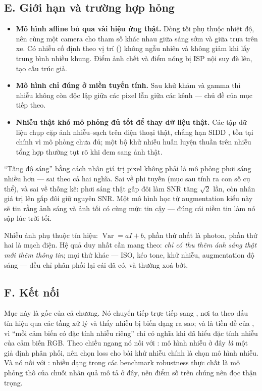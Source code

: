 \documentclass[../../../deep_learning.tex]{subfiles}
\begin{document}
\subsection{E. Giới hạn và trường hợp hỏng}
\begin{itemize}
\item \textbf{Mô hình affine bỏ qua vài hiệu ứng thật.} Dòng tối phụ thuộc nhiệt độ, nên cùng một camera cho tham số khác nhau giữa sáng sớm và giữa trưa trên xe. Có nhiễu cố định theo vị trí () không ngẫu nhiên và không giảm khi lấy trung bình nhiều khung. Điểm ảnh chết và điểm nóng bị ISP nội suy đè lên, tạo cấu trúc giả.
\item \textbf{Mô hình chỉ đúng ở miền tuyến tính.} Sau khử khảm và gamma thì nhiễu không còn độc lập giữa các pixel lẫn giữa các kênh --- chủ đề của mục tiếp theo.
\item \textbf{Nhiễu thật khó mô phỏng đủ tốt để thay dữ liệu thật.} Các tập dữ liệu chụp cặp ảnh nhiễu--sạch trên điện thoại thật, chẳng hạn SIDD \cite{abdelhamed2018sidd}, tồn tại chính vì mô phỏng chưa đủ; một bộ khử nhiễu huấn luyện thuần trên nhiễu tổng hợp thường tụt rõ khi đem sang ảnh thật.
\end{itemize}

\begin{cambay}
``Tăng độ sáng'' bằng cách nhân giá trị pixel không phải là mô phỏng phơi sáng nhiều hơn --- sai theo cả hai nghĩa. Sai về phi tuyến (mục sau tính ra con số cụ thể), và sai về thống kê: phơi sáng thật gấp đôi làm SNR tăng \(\sqrt{2}\) lần, còn nhân giá trị lên gấp đôi giữ nguyên SNR. Một mô hình học từ augmentation kiểu này sẽ tin rằng ảnh sáng và ảnh tối có cùng mức tin cậy --- đúng cái niềm tin làm nó sập lúc trời tối.
\end{cambay}

\begin{cannho}
Nhiễu ảnh phụ thuộc tín hiệu: \(\operatorname{Var} = aI + b\), phần thứ nhất là photon, phần thứ hai là mạch điện. Hệ quả duy nhất cần mang theo: \emph{chỉ có thu thêm ánh sáng thật mới thêm thông tin}; mọi thứ khác --- ISO, kéo tone, khử nhiễu, augmentation độ sáng --- đều chỉ phân phối lại cái đã có, và thường xoá bớt. 
\end{cannho}

\subsection{F. Kết nối}
Mục này là gốc của cả chương. Nó chuyển tiếp trực tiếp sang , nơi ta theo dấu tín hiệu qua các tầng xử lý và thấy nhiễu bị biến dạng ra sao; và là tiền đề của , vì ``mỗi cảm biến có đặc tính nhiễu riêng'' chỉ có nghĩa khi đã hiểu đặc tính nhiễu của cảm biến RGB. Theo chiều ngang nó nối với : mô hình nhiễu ở đây \emph{là} một giả định phân phối, nên chọn loss cho bài khử nhiễu chính là chọn mô hình nhiễu. 
Và nó nối với : nhiều dạng  trong các benchmark robustness thực chất là mô phỏng thô của chuỗi nhân quả mô tả ở đây, nên điểm số trên chúng nên đọc thận trọng.
\end{document}
